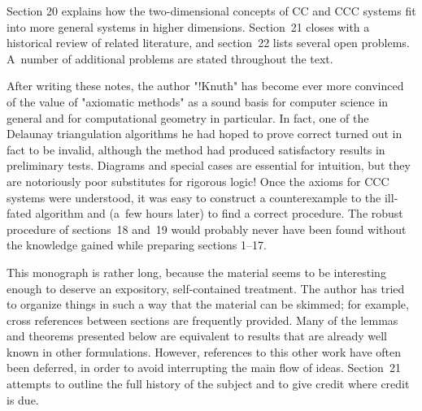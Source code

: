 Section 20 explains how the two-dimensional concepts of CC and CCC
systems fit into more general systems in higher dimensions. Section~21
closes with a historical review of related literature, and section~22
lists several open problems. A~number of additional problems are
stated throughout the text.

After writing these notes, the author "!Knuth" has become ever more
convinced of the value of "axiomatic methods" as a sound basis for
computer science in general and for computational geometry in
particular. In fact, one of the Delaunay triangulation algorithms he
had hoped to prove correct turned out in fact to be invalid, although
the method had produced satisfactory results in preliminary tests.
Diagrams and special cases are essential for intuition, but they are
notoriously poor substitutes for rigorous logic! Once the axioms for
CCC systems were understood, it was easy to construct a counterexample
to the ill-fated algorithm and (a~few hours later) to find a correct
procedure. The robust procedure of sections~18 and~19 would probably
never have been found without the knowledge gained while preparing
sections 1--17.

\quad
This monograph is rather long, because the material seems to be
interesting enough to deserve an expository, self-contained treatment.
The author has tried to organize things in such a way that the material
can be skimmed; for example, cross references between sections are
frequently provided. Many of the lemmas and theorems presented below
are equivalent to results that are already well known in other
formulations. However, references to this other work have often been
deferred, in order to avoid interrupting the main flow of ideas.
Section~21 attempts to outline the full history of the subject and to
give credit where credit is due. 

